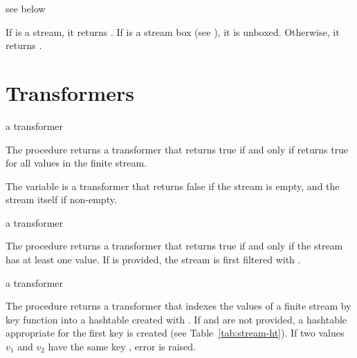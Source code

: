 \begin{procedure}
\end{procedure}
\returns{} see below

If  is a stream, it returns . If  is a stream
box (see ), it is unboxed. Otherwise, it returns .

\section {Transformers}

\begin{procedure}
\end{procedure}
\returns{} a transformer

The  procedure returns a transformer that returns true if and only if
 returns true for all values in the finite stream.

\begin{variable}
\end{variable}
\antipar

The  variable is a transformer that returns false if the stream is empty, and
the stream itself if non-empty.

\begin{procedure}
\end{procedure}
\returns{} a transformer

The  procedure returns a transformer that returns true if and only if the
stream has at least one value. If  is provided, the stream is first
filtered with .

\begin{procedure}
\end{procedure}
\returns{} a transformer

The  procedure returns a transformer that indexes the values of a finite
stream by key function  into a hashtable created with . If  and  are not provided, a hashtable
appropriate for the first key is created (see Table~\ref{tab:stream-ht}). If two values
$v_1$ and $v_2$ have the same key , error  is raised.

